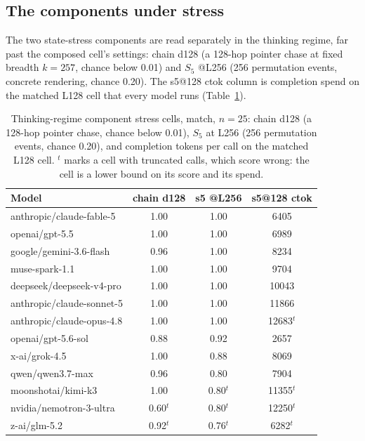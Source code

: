 \documentclass[11pt]{article}
\newcommand{\marktrunc}{$^{t}$}
\newcommand{\Sfive}{$S_5$}
\begin{document}
\subsection{The components under stress}

The two state-stress components are read separately in the thinking regime, far past the
composed cell's settings: chain d128 (a 128-hop pointer chase at fixed breadth $k=257$, chance
below 0.01) and \Sfive{} @L256 (256 permutation events, concrete rendering, chance 0.20). The
s5@128 ctok column is completion spend on the matched L128 cell that every model runs
(Table~\ref{tab:components}).

\begin{table}[h]
\centering
\begin{tabular}{lccc}
\toprule
Model & chain d128 & s5 @L256 & s5@128 ctok \\
\midrule
anthropic/claude-fable-5 & 1.00 & 1.00 & 6405 \\
openai/gpt-5.5 & 1.00 & 1.00 & 6989 \\
google/gemini-3.6-flash & 0.96 & 1.00 & 8234 \\
muse-spark-1.1 & 1.00 & 1.00 & 9704 \\
deepseek/deepseek-v4-pro & 1.00 & 1.00 & 10043 \\
anthropic/claude-sonnet-5 & 1.00 & 1.00 & 11866 \\
anthropic/claude-opus-4.8 & 1.00 & 1.00 & 12683\marktrunc \\
openai/gpt-5.6-sol & 0.88 & 0.92 & 2657 \\
x-ai/grok-4.5 & 1.00 & 0.88 & 8069 \\
qwen/qwen3.7-max & 0.96 & 0.80 & 7904 \\
moonshotai/kimi-k3 & 1.00 & 0.80\marktrunc & 11355\marktrunc \\
nvidia/nemotron-3-ultra & 0.60\marktrunc & 0.80\marktrunc & 12250\marktrunc \\
z-ai/glm-5.2 & 0.92\marktrunc & 0.76\marktrunc & 6282\marktrunc \\
\bottomrule
\end{tabular}
\caption{Thinking-regime component stress cells, match, $n=25$: chain d128 (a 128-hop
pointer chase, chance below 0.01), \Sfive{} at L256 (256 permutation events, chance 0.20),
and completion tokens per call on the matched L128 cell. \marktrunc{} marks a cell with
truncated calls, which score wrong: the cell is a lower bound on its score and its spend.}
\label{tab:components}
\end{table}
\end{document}
